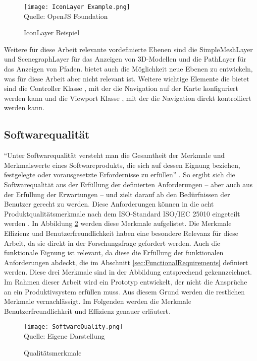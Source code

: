 \begin{figure}[H]
    \caption{IconLayer Beispiel}\label{fig:IconLayerExample}
    \texttt{[image: IconLayer Example.png]}
    \\
    Quelle: OpenJS Foundation \cite{DeckGlMeteorites}
\end{figure}

Weitere für diese Arbeit relevante vordefinierte Ebenen sind die SimpleMeshLayer \cite{DeckglSimpleMeshLayer} und ScenegraphLayer \cite{DeckglScenegraphLayer} für das Anzeigen von 3D-Modellen und die PathLayer für das Anzeigen von Pfaden. \deckgl{} bietet auch die Möglichkeit neue Ebenen zu entwickeln, was für diese Arbeit aber nicht relevant ist. Weitere wichtige Elemente die \deckgl{} bietet sind die Controller Klasse \cite{DeckglController}, mit der die Navigation auf der Karte konfiguriert werden kann und die Viewport Klasse \cite{DeckglViewport}, mit der die Navigation direkt kontrolliert werden kann.

\subsection{Softwarequalität}
``Unter Softwarequalität versteht man die Gesamtheit der Merkmale und Merkmalswerte eines Softwareprodukts, die sich auf dessen Eignung beziehen, festgelegte oder vorausgesetzte Erfordernisse zu erfüllen'' \cite[S.~257]{Balzert1998}. So ergibt sich die Softwarequalität aus der Erfüllung der definierten Anforderungen – aber auch aus der Erfüllung der Erwartungen – und zielt darauf ab den Bedürfnissen der Benutzer gerecht zu werden. Diese Anforderungen können in die acht Produktqualitätsmerkmale nach dem ISO-Standard ISO/IEC 25010 eingeteilt werden \cite{ISO25010}. In Abbildung \ref{fig:SoftwareQuality} werden diese Merkmale aufgelistet. Die Merkmale Effizienz und Benutzerfreundlichkeit haben eine besondere Relevanz für diese Arbeit, da sie direkt in der Forschungsfrage gefordert werden. Auch die funktionale Eignung ist relevant, da diese die Erfüllung der funktionalen Anforderungen abdeckt, die im Abschnitt \ref{sec:FunctionalRequirements} definiert werden. Diese drei Merkmale sind in der Abbildung entsprechend gekennzeichnet. Im Rahmen dieser Arbeit wird ein Prototyp entwickelt, der nicht die Ansprüche an ein Produktivsystem erfüllen muss. Aus diesem Grund werden die restlichen Merkmale vernachlässigt. Im Folgenden werden die Merkmale Benutzerfreundlichkeit und Effizienz genauer erläutert.

\begin{figure}[H]
    \caption{Qualitätsmerkmale}\label{fig:SoftwareQuality}
    \texttt{[image: SoftwareQuality.png]}
    \\
    Quelle: Eigene Darstellung
\end{figure}

